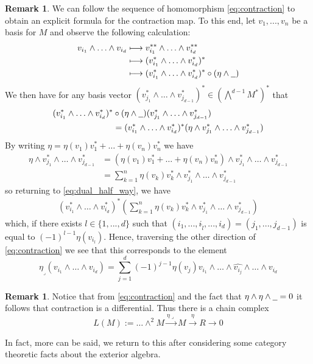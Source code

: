 \documentclass[12pt]{article}
\theoremstyle{plain}
\theoremstyle{definition}
\newtheorem{remark}[thm]{Remark}
\newcommand{\und}[1]{\underline{\hspace{#1 cm}}}
\newcommand{\lto}{\longrightarrow}
\begin{document}
	\begin{remark}
		We can follow the sequence of homomorphism \eqref{eq:contraction} to obtain an explicit formula for the contraction map. To this end, let $v_1,...,v_n$ be a basis for $M$ and observe the following calculation:
		\begin{align*}
			v_{i_1} \wedge \hdots \wedge v_{i_d} &\longmapsto v_{i_1}^{\ast\ast} \wedge \hdots \wedge v_{i_d}^{\ast\ast}\\
			&\longmapsto (v_{i_1}^\ast \wedge \hdots \wedge v_{i_d}^\ast)^\ast\\
			&\longmapsto (v_{i_1}^\ast \wedge \hdots \wedge v_{i_d}^\ast)^\ast\circ(\eta \wedge \und{0.2})
		\end{align*}
		We then have for any basis vector $(v_{j_1}^\ast \wedge \hdots \wedge v_{j_{d-1}}^\ast)^\ast \in (\bigwedge^{d-1}M^\ast)^\ast$ that
		\begin{align}
			(v_{i_1}^\ast \wedge \hdots \wedge v_{i_d}^\ast)^\ast&\circ(\eta \wedge \und{0.2})(v_{j_1}^\ast \wedge \hdots \wedge v_{j_{d-1}}^\ast)\\
			\label{eq:dual_half_way}&= (v_{i_1}^\ast \wedge \hdots \wedge v_{i_d}^\ast)^\ast(\eta \wedge v_{j_1}^\ast \wedge \hdots \wedge v_{j_{d-1}}^\ast)
		\end{align}
		By writing $\eta = \eta(v_1)v_1^\ast + \hdots + \eta(v_n)v_n^\ast$ we have
		\begin{align*}
			\eta \wedge v_{j_1}^\ast \wedge \hdots \wedge v_{j_{d-1}}^\ast &= (\eta(v_1)v_1^\ast+ \hdots + \eta(v_n)v_n^\ast)\wedge v_{j_1}^\ast \wedge \hdots \wedge v_{j_{d-1}}^\ast\\
			&= \sum_{k = 1}^n \eta(v_k)v_k^\ast \wedge v_{j_1}^\ast \wedge \hdots \wedge v_{j_{d-1}}^\ast
		\end{align*}
		so returning to \eqref{eq:dual_half_way}, we have
		\begin{align*}
			(v_{i_1}^\ast \wedge \hdots \wedge v_{i_d}^\ast)^\ast(\sum_{k = 1}^n \eta(v_k)v_k^\ast \wedge v_{j_1}^\ast \wedge \hdots \wedge v_{j_{d-1}}^\ast)
		\end{align*}
		which, if there exists $l \in \lbrace 1,...,d\rbrace$ such that $(i_1,...,i_{\hat{l}},...,i_d) = (j_1,...,j_{d-1})$ is equal to $(-1)^{l-1}\eta(v_{i_l})$. Hence, traversing the other direction of \eqref{eq:contraction} we see that this corresponds to the element
		\begin{equation}
			\eta_{\lrcorner}(v_{i_1} \wedge \hdots \wedge v_{i_d}) = \sum_{j = 1}^d(-1)^{j-1} \eta(v_j) v_{i_1} \wedge \hdots \wedge \hat{v_{i_j}} \wedge \hdots \wedge v_{i_d}
		\end{equation}
	\end{remark}
	\begin{remark}\label{rmk:contraction_differential}
		Notice that from \eqref{eq:contraction} and the fact that $\eta \wedge \eta \wedge \und{0.2} = 0$ it follows that contraction is a differential. Thus there is a chain complex
		\begin{equation}
			L(M) := \hdots \wedge^2 M \stackrel{\eta\lrcorner}{\lto} M \stackrel{\eta}{\lto} R \lto 0
		\end{equation}
	\end{remark}
	In fact, more can be said, we return to this after considering some category theoretic facts about the exterior algebra.
\end{document}
